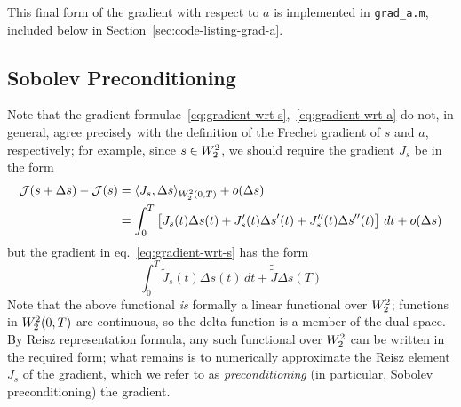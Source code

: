\documentclass[letterpaper, 10pt, draft]{amsart}
\theoremstyle{definition}
\theoremstyle{remark}
\begin{document}
This final form of the gradient with respect to $a$ is implemented in
\verb+grad_a.m+, included below in Section~\ref{sec:code-listing-grad-a}.

\subsection{Sobolev Preconditioning}
Note that the gradient
formulae~\eqref{eq:gradient-wrt-s},~\eqref{eq:gradient-wrt-a} do not, in
general, agree precisely with the definition of the Frechet gradient of $s$ and
$a$, respectively; for example, since $s \in W_2^2$, we should require
the gradient $J_s$ be in the form
\begin{align*}
  \mathcal{J}(s+{\Delta s}) - \mathcal{J}(s)
  & = \langle J_s, {\Delta s} \rangle_{W_2^2(0,T)}
  + o({\Delta s})
  \\
  & = \int_0^T \left[
    J_s(t) {\Delta s}(t)
    + J_s'(t) {\Delta s}'(t)
    + J_s''(t) {\Delta s}''(t)
    \right]\,dt
    + o({\Delta s})
\end{align*}
but the gradient in eq.~\eqref{eq:gradient-wrt-s} has the form
\[
  \int_0^T \tilde{J}_s(t) {\Delta s}(t) \,dt + \tilde{\tilde{J}} {\Delta s}(T)
\]
Note that the above functional \emph{is} formally a linear functional over
$W_2^2{}$; functions in $W_2^2(0,T)$ are continuous, so the
delta function is a member of the dual space.
By Reisz representation formula, any such functional over $W_2^2$ can
be written in the required form; what remains is to numerically approximate the
Reisz element $J_s$ of the gradient, which we refer to as \emph{preconditioning}
(in particular, Sobolev preconditioning) the gradient.
\end{document}
